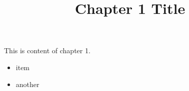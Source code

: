 \documentclass[a4paper]{article}
\title{\phantomsection%
  Chapter 1 Title%
  \label{chapter-1-title}}
\author{}
\date{}
\begin{document}
\maketitle

This is content of chapter 1.
%
\begin{itemize}

\item item

\item another

\end{itemize}
\end{document}
